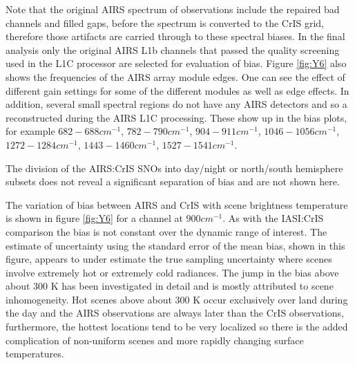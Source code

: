\documentclass[twocolumn,10pt]{article}
\begin{document}


Note that the original AIRS spectrum of observations include the repaired bad channels and filled gaps, before the spectrum is converted to the CrIS grid, therefore those artifacts are carried through to these spectral biases. In the final analysis only the original AIRS L1b channels that passed the quality screening used in the L1C processor are selected for evaluation of bias. Figure \ref{fig:Y6} also shows the frequencies of the AIRS array module edges. One can see the effect of different gain settings for some of the different modules as well as edge effects. In addition, several small spectral regions do not have any AIRS detectors and so a reconstructed during the AIRS L1C processing. These show up in the bias plots, for example $ 682 - 688 cm^{-1} $, $ 782 - 790 cm^{-1} $, $ 904 - 911 cm^{-1} $, $ 1046 - 1056 cm^{-1} $, $ 1272 - 1284 cm^{-1} $, $ 1443 - 1460 cm^{-1} $, $ 1527 - 1541 cm^{-1} $.

The division of the AIRS:CrIS SNOs into day/night or north/south hemisphere subsets does not reveal a significant separation of bias and are not shown here.

The variation of bias between AIRS and CrIS with scene brightness temperature is shown in figure \ref{fig:Y6} for a channel at $ 900 cm^{-1} $. As with the IASI:CrIS comparison the bias is not constant over the dynamic range of interest. The estimate of uncertainty using the standard error of the mean bias, shown in this figure, appears to under estimate the true sampling uncertainty where scenes involve extremely hot or extremely cold radiances. The jump in the bias above about 300 K has been investigated in detail and is mostly attributed to scene inhomogeneity. Hot scenes above about 300 K occur exclusively over land during the day and the AIRS observations are always later than the CrIS observations, furthermore, the hottest locations tend to be very localized so there is the added complication of non-uniform scenes and more rapidly changing surface temperatures.
\end{document}
